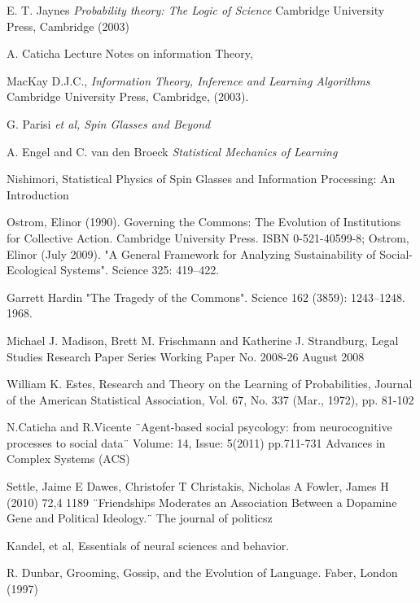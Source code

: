 \documentclass[11pt]{article}
\begin{document}
\begin{thebibliography}{99}

E. T. Jaynes {\it Probability theory: The Logic of
    Science} \/Cambridge University Press, Cambridge (2003)

 A. Caticha Lecture Notes on information Theory,

 MacKay D.J.C., \textit{Information Theory, Inference
    and Learning Algorithms}
Cambridge University Press, Cambridge, (2003).

 G. Parisi {\it et al, Spin Glasses and Beyond}

 A. Engel and C. van den Broeck {\it Statistical
    Mechanics of Learning}

 Nishimori, Statistical Physics of Spin Glasses and Information Processing: An Introduction

Ostrom, Elinor (1990). Governing the Commons: The Evolution of Institutions for Collective Action. Cambridge University Press. ISBN 0-521-40599-8; Ostrom, Elinor (July 2009). "A General Framework for Analyzing Sustainability of Social-Ecological Systems". Science 325: 419–422.

Garrett Hardin
"The Tragedy of the Commons". Science 162 (3859): 1243–1248. 1968.

Michael J. Madison, Brett M. Frischmann
and Katherine J. Strandburg,
Legal Studies Research Paper Series
Working Paper No. 2008-26
August 2008

William K. Estes, Research and Theory on the
Learning of Probabilities,
Journal of the American Statistical Association, Vol. 67, No. 337
(Mar., 1972), pp. 81-102

N.Caticha and R.Vicente ¨Agent-based social psycology: from neurocognitive processes to social data¨ Volume: 14, Issue: 5(2011) pp.711-731 Advances in Complex Systems (ACS)

Settle, Jaime E Dawes, Christofer T Christakis, Nicholas A Fowler, James H (2010) 72,4 1189 ¨Friendships Moderates an Association Between a Dopamine Gene and Political Ideology.¨ The journal of politicsz

 Kandel, et al, Essentials of neural sciences and behavior.


 R. Dunbar,  Grooming, Gossip, and the
Evolution of Language. Faber, London (1997)


\end{thebibliography}
\end{document}

